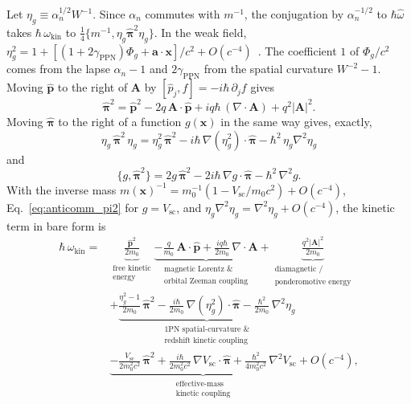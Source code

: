 \documentclass[aps,prd,onecolumn,tightenlines,nofootinbib,notitlepage,11pt,floatfix]{revtex4-2}
\theoremstyle{indentedtheorem}
\begin{document}
Let $\eta_g\equiv\alpha_n^{1/2}W^{-1}$. Since $\alpha_n$ commutes with $m^{-1}$, the conjugation by $\alpha_n^{-1/2}$ to $\hbar\hat{\omega}$ takes $\hbar\,\omega_\text{kin}$ to $\tfrac{1}{4}\{m^{-1},\eta_g\hat{\boldsymbol{\pi}}^2\eta_g\}$. In the weak field, $\eta_g^2 = 1 + [(1+2\gamma_\text{PPN})\Phi_g + \mathbf{a}\cdot\mathbf{x}]/c^2 + O(c^{-4})$~\citep{Will2014Confrontation}. The coefficient $1$ of $\Phi_g/c^2$ comes from the lapse $\alpha_n-1$ and $2\gamma_\text{PPN}$ from the spatial curvature $W^{-2}-1$. Moving $\hat{\mathbf{p}}$ to the right of $\mathbf{A}$ by $[\hat{p}_j,f]=-i\hbar\,\partial_jf$ gives
\begin{equation}
    \hat{\boldsymbol{\pi}}^2 = \hat{\mathbf{p}}^2 - 2q\,\mathbf{A}\cdot\hat{\mathbf{p}} + iq\hbar\,(\nabla\cdot\mathbf{A}) + q^2|\mathbf{A}|^2 .
    \label{eq:pi2_bare}
\end{equation}
Moving $\hat{\boldsymbol{\pi}}$ to the right of a function $g(\mathbf{x})$ in the same way gives, exactly,
\begin{equation}
    \eta_g\,\hat{\boldsymbol{\pi}}^2\,\eta_g = \eta_g^2\,\hat{\boldsymbol{\pi}}^2 - i\hbar\,\nabla(\eta_g^2)\cdot\hat{\boldsymbol{\pi}} - \hbar^2\,\eta_g\nabla^2\eta_g
    \label{eq:eta_pi_eta}
\end{equation}
and
\begin{equation}
    \{g,\hat{\boldsymbol{\pi}}^2\} = 2g\,\hat{\boldsymbol{\pi}}^2 - 2i\hbar\,\nabla g\cdot\hat{\boldsymbol{\pi}} - \hbar^2\,\nabla^2 g .
    \label{eq:anticomm_pi2}
\end{equation}
With the inverse mass $m(\mathbf{x})^{-1} = m_0^{-1}(1 - V_\text{sc}/m_0c^2) + O(c^{-4})$, Eq.~\eqref{eq:anticomm_pi2} for $g=V_\text{sc}$, and $\eta_g\nabla^2\eta_g=\nabla^2\eta_g+O(c^{-4})$, the kinetic term in bare form is
\begin{equation}
    \begin{aligned}
    \hbar\,\omega_\text{kin} = {} &
    \underbrace{\frac{\hat{\mathbf{p}}^2}{2m_0}}_{\substack{\text{free kinetic} \\ \text{energy}}}
    \underbrace{- \frac{q}{m_0}\,\mathbf{A}\cdot\hat{\mathbf{p}} + \frac{iq\hbar}{2m_0}\,\nabla\cdot\mathbf{A}}_{\substack{\text{magnetic Lorentz \&} \\ \text{orbital Zeeman coupling}}}
    + \underbrace{\frac{q^2|\mathbf{A}|^2}{2m_0}}_{\substack{\text{diamagnetic /} \\ \text{ponderomotive energy}}}
    \\ & + \underbrace{\frac{\eta_g^2-1}{2m_0}\,\hat{\boldsymbol{\pi}}^2 - \frac{i\hbar}{2m_0}\,\nabla(\eta_g^2)\cdot\hat{\boldsymbol{\pi}} - \frac{\hbar^2}{2m_0}\,\nabla^2\eta_g}_{\substack{\text{1PN spatial-curvature \&} \\ \text{redshift kinetic coupling}}} \\
    & \underbrace{- \frac{V_\text{sc}}{2m_0^2c^2}\,\hat{\boldsymbol{\pi}}^2 + \frac{i\hbar}{2m_0^2c^2}\,\nabla V_\text{sc}\cdot\hat{\boldsymbol{\pi}} + \frac{\hbar^2}{4m_0^2c^2}\,\nabla^2V_\text{sc}}_{\substack{\text{effective-mass} \\ \text{kinetic coupling}}} + O(c^{-4}) ,
    \end{aligned}
    \label{eq:kin_expanded}
\end{equation}
\end{document}
